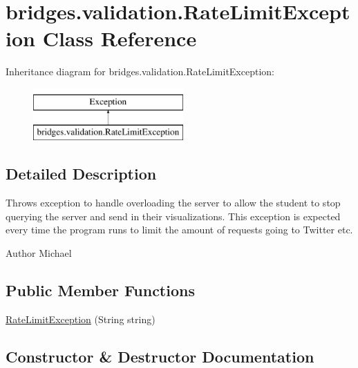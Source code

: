 \hypertarget{classbridges_1_1validation_1_1_rate_limit_exception}{}\section{bridges.\+validation.\+Rate\+Limit\+Exception Class Reference}
\label{classbridges_1_1validation_1_1_rate_limit_exception}
Inheritance diagram for bridges.\+validation.\+Rate\+Limit\+Exception\+:\begin{figure}[H]
\begin{center}
\leavevmode
\includegraphics[height=2.000000cm]{classbridges_1_1validation_1_1_rate_limit_exception}
\end{center}
\end{figure}


\subsection{Detailed Description}
Throws exception to handle overloading the server to allow the student to stop querying the server and send in their visualizations. This exception is expected every time the program runs to limit the amount of requests going to Twitter etc.

\begin{DoxyAuthor}{Author}
Michael 
\end{DoxyAuthor}
\subsection*{Public Member Functions}
\begin{DoxyCompactItemize}
\item 
\mbox{\hyperlink{classbridges_1_1validation_1_1_rate_limit_exception_a8375495a80a80213fe9201921c43afbc}{Rate\+Limit\+Exception}} (String string)
\end{DoxyCompactItemize}


\subsection{Constructor \& Destructor Documentation}
\mbox{\label{classbridges_1_1validation_1_1_rate_limit_exception_a8375495a80a80213fe9201921c43afbc}} 
